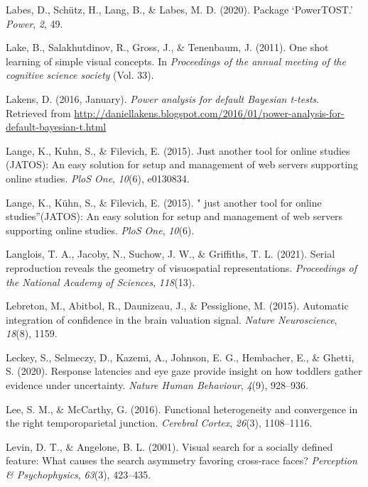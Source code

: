 \documentclass[12pt,twoside]{reedthesis}
\newenvironment{CSLReferences}%
  {}%
  {\par}
\begin{document}
\begin{CSLReferences}{1}{0}
\leavevmode\hypertarget{ref-labes2020package}{}%
Labes, D., Schütz, H., Lang, B., \& Labes, M. D. (2020). Package {`PowerTOST.'} \emph{Power}, \emph{2}, 49.

\leavevmode\hypertarget{ref-lake2011one}{}%
Lake, B., Salakhutdinov, R., Gross, J., \& Tenenbaum, J. (2011). One shot learning of simple visual concepts. In \emph{Proceedings of the annual meeting of the cognitive science society} (Vol. 33).

\leavevmode\hypertarget{ref-lakens_2016}{}%
Lakens, D. (2016, January). \emph{Power analysis for default Bayesian t-tests}. Retrieved from \url{http://daniellakens.blogspot.com/2016/01/power-analysis-for-default-bayesian-t.html}

\leavevmode\hypertarget{ref-lange2015jatos}{}%
Lange, K., Kuhn, S., \& Filevich, E. (2015). Just another tool for online studies (JATOS): An easy solution for setup and management of web servers supporting online studies. \emph{PloS One}, \emph{10}(6), e0130834.

\leavevmode\hypertarget{ref-lange2015just}{}%
Lange, K., Kühn, S., \& Filevich, E. (2015). " just another tool for online studies''(JATOS): An easy solution for setup and management of web servers supporting online studies. \emph{PloS One}, \emph{10}(6).

\leavevmode\hypertarget{ref-langlois2021serial}{}%
Langlois, T. A., Jacoby, N., Suchow, J. W., \& Griffiths, T. L. (2021). Serial reproduction reveals the geometry of visuospatial representations. \emph{Proceedings of the National Academy of Sciences}, \emph{118}(13).

\leavevmode\hypertarget{ref-lebreton2015automatic}{}%
Lebreton, M., Abitbol, R., Daunizeau, J., \& Pessiglione, M. (2015). Automatic integration of confidence in the brain valuation signal. \emph{Nature Neuroscience}, \emph{18}(8), 1159.

\leavevmode\hypertarget{ref-leckey2020response}{}%
Leckey, S., Selmeczy, D., Kazemi, A., Johnson, E. G., Hembacher, E., \& Ghetti, S. (2020). Response latencies and eye gaze provide insight on how toddlers gather evidence under uncertainty. \emph{Nature Human Behaviour}, \emph{4}(9), 928--936.

\leavevmode\hypertarget{ref-lee2016functional}{}%
Lee, S. M., \& McCarthy, G. (2016). Functional heterogeneity and convergence in the right temporoparietal junction. \emph{Cerebral Cortex}, \emph{26}(3), 1108--1116.

\leavevmode\hypertarget{ref-levin2001visual}{}%
Levin, D. T., \& Angelone, B. L. (2001). Visual search for a socially defined feature: What causes the search asymmetry favoring cross-race faces? \emph{Perception \& Psychophysics}, \emph{63}(3), 423--435.


\end{CSLReferences}
\end{document}
